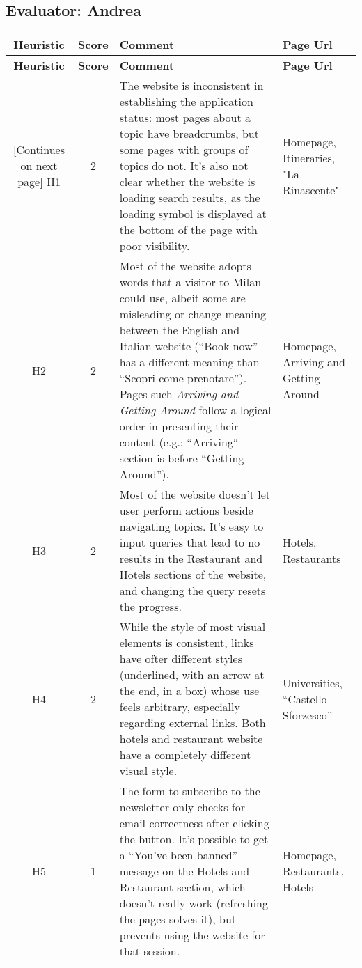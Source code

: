 \begin{small}
\pagebreak

\subsection{Evaluator: Andrea}
\begin{tabularx}{\linewidth}{c c X p{3cm}}
    \textbf{Heuristic} & \textbf{Score} & \textbf{Comment} & \textbf{Page Url}
    \\ \midrule
    \endfirsthead
    \toprule
    \textbf{Heuristic} & \textbf{Score} & \textbf{Comment} & \textbf{Page Url}
    \\ \midrule
    \endhead
    \midrule
    \footnotesize [Continues on next page]
    \endfoot
    \bottomrule
    \endlastfoot
    H1 & 2 & The website is inconsistent in establishing the application status: most pages about a topic have breadcrumbs, but some pages with groups of topics do not. It's also not clear whether the website is loading search results, as the loading symbol is displayed at the bottom of the page with poor visibility. & Homepage, Itineraries, "La Rinascente" \\ \midrule
    H2 & 2 & Most of the website adopts words that a visitor to Milan could use, albeit some are misleading or change meaning between the English and Italian website (``Book now'' has a different meaning than ``Scopri come prenotare''). Pages such \emph{Arriving and Getting Around} follow a logical order in presenting their content (e.g.: ``Arriving`` section is before ``Getting Around''). & Homepage, Arriving and Getting Around \\ \midrule
    H3 & 2 & Most of the website doesn't let user perform actions beside navigating topics. It's easy to input queries that lead to no results in the Restaurant and Hotels sections of the website, and changing the query  resets the progress. & Hotels, Restaurants\\ \midrule
    H4 & 2 & While the style of most visual elements is consistent, links have ofter different styles (underlined, with an arrow at the end, in a box) whose use feels arbitrary, especially regarding external links. Both hotels and restaurant website have a completely different visual style. & Universities, ``Castello Sforzesco''\\ \midrule
    H5 & 1 & The form to subscribe to the newsletter only checks for email correctness after clicking the button. It's possible to get a ``You've been banned'' message on the Hotels and Restaurant section, which doesn't really work (refreshing the pages solves it), but prevents using the website for that session. & Homepage, Restaurants, Hotels \\ \midrule

\end{tabularx}
\end{small}
